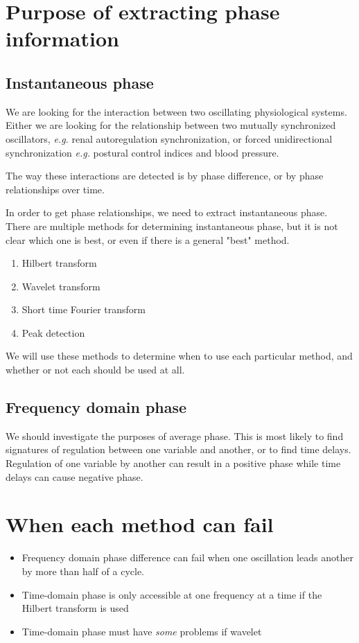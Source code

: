 \documentclass{article}
\begin{document}
\section*{Purpose of extracting phase information}

\subsection*{Instantaneous phase}
We are looking for the interaction between two oscillating physiological systems. Either we are looking for the relationship between two mutually synchronized oscillators, \textit{e.g.} renal autoregulation synchronization, or forced unidirectional synchronization \textit{e.g.} postural control indices and blood pressure. 

The way these interactions are detected is by phase difference, or by phase relationships over time. 

In order to get phase relationships, we need to extract instantaneous phase. There are multiple methods for determining instantaneous phase, but it is not clear which one is best, or even if there is a general "best" method.
\begin{enumerate}
\item Hilbert transform
\item Wavelet transform
\item Short time Fourier transform
\item Peak detection
\end{enumerate}

We will use these methods to determine when to use each particular method, and whether or not each should be used at all.

\subsection*{Frequency domain phase}

We should investigate the purposes of average phase. This is most likely to find signatures of regulation between one variable and another, or to find time delays. Regulation of one variable by another can result in a positive phase while time delays can cause negative phase.

\section*{When each method can fail}
\begin{itemize}
\item Frequency domain phase difference can fail when one oscillation leads another by more than half of a cycle.
\item Time-domain phase is only accessible at one frequency at a time if the Hilbert transform is used
\item Time-domain phase must have \textit{some} problems if wavelet 
\end{itemize}
\end{document}
